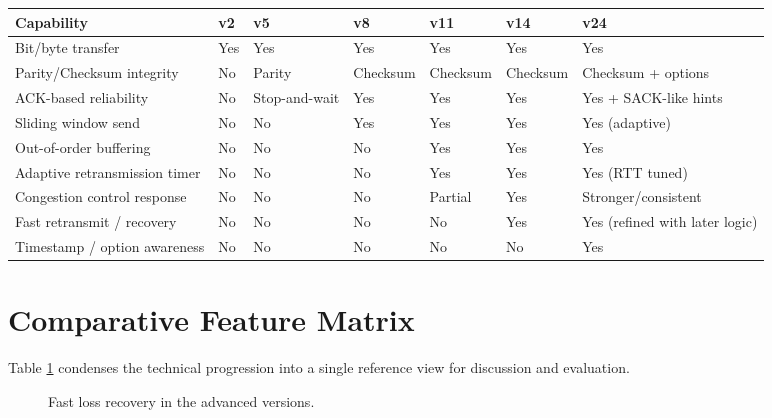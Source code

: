 \clearpage
\begin{table}[H]
\centering
{}
\small
\renewcommand{\arraystretch}{1.18}
\begin{tabular}{|p{4.1cm}|>{\centering\arraybackslash}p{1.25cm}|>{\centering\arraybackslash}p{1.45cm}|>{\centering\arraybackslash}p{1.45cm}|>{\centering\arraybackslash}p{1.45cm}|>{\centering\arraybackslash}p{1.45cm}|>{\centering\arraybackslash}p{1.45cm}|}
\hline
\textbf{Capability} & \textbf{v2} & \textbf{v5} & \textbf{v8} & \textbf{v11} & \textbf{v14} & \textbf{v24} \\
\hline
Bit/byte transfer & Yes & Yes & Yes & Yes & Yes & Yes \\
\hline
Parity/Checksum integrity & No & Parity & Checksum & Checksum & Checksum & Checksum + options \\
\hline
ACK-based reliability & No & Stop-and-wait & Yes & Yes & Yes & Yes + SACK-like hints \\
\hline
Sliding window send & No & No & Yes & Yes & Yes & Yes (adaptive) \\
\hline
Out-of-order buffering & No & No & No & Yes & Yes & Yes \\
\hline
Adaptive retransmission timer & No & No & No & Yes & Yes & Yes (RTT tuned) \\
\hline
Congestion control response & No & No & No & Partial & Yes & Stronger/consistent \\
\hline
Fast retransmit / recovery & No & No & No & No & Yes & Yes (refined with later logic) \\
\hline
Timestamp / option awareness & No & No & No & No & No & Yes \\
\hline
\end{tabular}
\label{tab:feature-compare-ch4}
\end{table}

\section{Comparative Feature Matrix}

Table \ref{tab:feature-compare-ch4} condenses the technical progression into a
single reference view for discussion and evaluation.

\clearpage
\begin{figure}[H]
\centering
{}
\caption{Fast loss recovery in the advanced versions.
}
\label{fig:loss-recovery-path}
\end{figure}

